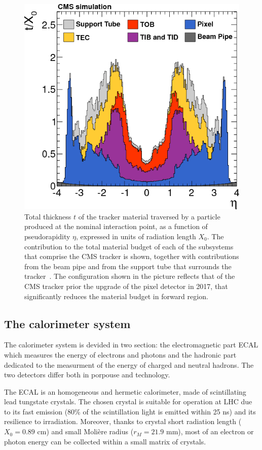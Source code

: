 \begin{figure}[h!]
  \centering
  \includegraphics[width = .7\textwidth]{figures/cms/MaterialBudget.png}
  \caption{Total thickness $t$ of the tracker material traversed by a particle produced at the nominal interaction point,
    as a function of pseudorapidity $\eta$, expressed in units of radiation length $X_0$.
    The contribution to the total material budget of each of the subsystems that comprise the CMS tracker is shown,
    together with contributions from the beam pipe and from the support tube that surrounds the tracker~\cite{cms_trk}.
    The configuration shown in the picture reflects that of the CMS tracker prior the upgrade of the
    pixel detector in 2017, that significantly reduces the material budget in forward region.}
  \label{fig:cms_tracker_material}
\end{figure}

\subsection{The calorimeter system}
\label{sec:cms_calo}
The calorimeter system is devided in two section: the electromagnetic part ECAL which measures the energy
of electrons and photons and the hadronic part dedicated to the measurment of the energy of charged and
neutral hadrons. The two detectors differ both in porpouse and technology.

The ECAL is an homogeneous and hermetic calorimeter, made of scintillating lead tungstate
crystals. The chosen crystal is suitable for operation at LHC due to its fast emission
(80\% of the scintillation light is emitted within 25 ns) and its resilience to irradiation. Moreover,
thanks to crystal short radiation length ($X_0 = 0.89$ cm) and small Molière radius ($r_M = 21.9$
mm), most of an electron or photon energy can be collected within a small matrix of crystals.


